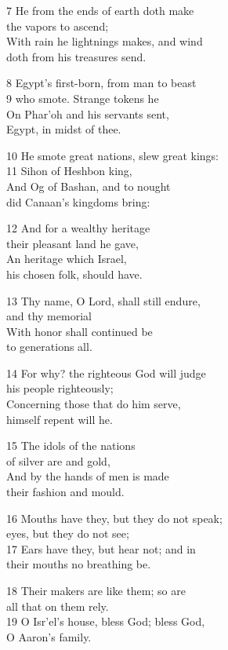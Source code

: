 7 He from the ends of earth doth make\\
the vapors to ascend;\\
With rain he lightnings makes, and wind\\
doth from his treasures send.

8 Egypt’s first-born, from man to beast\\
9 who smote. Strange tokens he\\
On Phar’oh and his servants sent,\\
Egypt, in midst of thee.

10 He smote great nations, slew great kings:\\
11 Sihon of Heshbon king,\\
And Og of Bashan, and to nought\\
did Canaan’s kingdoms bring:

12 And for a wealthy heritage\\
their pleasant land he gave,\\
An heritage which Israel,\\
his chosen folk, should have.

13 Thy name, O Lord, shall still endure,\\
and thy memorial\\
With honor shall continued be\\
to generations all.

14 For why? the righteous God will judge\\
his people righteously;\\
Concerning those that do him serve,\\
himself repent will he.

15 The idols of the nations\\
of silver are and gold,\\
And by the hands of men is made\\
their fashion and mould.

16 Mouths have they, but they do not speak;\\
eyes, but they do not see;\\
17 Ears have they, but hear not; and in\\
their mouths no breathing be.

18 Their makers are like them; so are\\
all that on them rely.\\
19 O Isr’el’s house, bless God; bless God,\\
O Aaron’s family.

